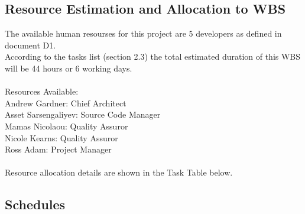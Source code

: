 \documentclass{l3deliverable}
\begin{document}
{%

\subsection{Resource Estimation and Allocation to WBS\label{sec:allocation}}
The available human resourses for this project are 5 developers as defined in document D1.\\
According to the tasks list (section 2.3) the total estimated duration of this WBS will be 44 hours or 6 working days.\\
\\

Resources Available:\\
Andrew Gardner: Chief Architect \\
Asset Sarsengaliyev: Source Code Manager\\ 
Mamas Nicolaou: Quality Assuror \\
Nicole Kearns: Quality Assuror \\
Ross Adam: Project Manager \\
\\

Resource allocation details are shown in the Task Table below. 


\subsection{Schedules}

}
\end{document}
